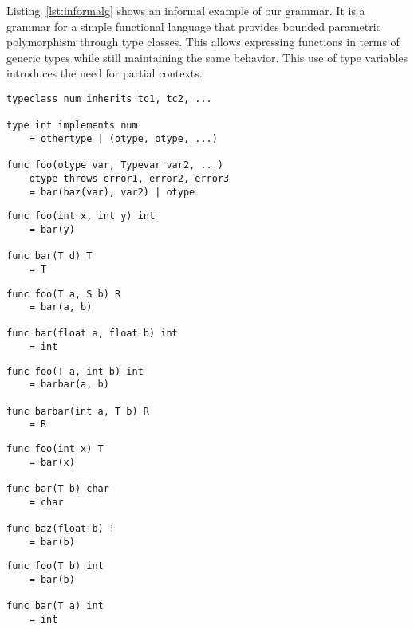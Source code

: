 \documentclass{acm_proc_article-sp}
\begin{document}
Listing~\ref{lst:informalg} shows an informal example of our grammar. It is a
grammar for a simple functional language that provides bounded parametric
polymorphism through type classes. This allows expressing functions in terms of
generic types while still maintaining the same behavior. This use of type
variables introduces the need for partial contexts.

\begin{lstlisting}[caption=Grammar displayed informally,language=Paratype,label=lst:informalg]
typeclass num inherits tc1, tc2, ...

type int implements num
    = othertype | (otype, otype, ...)

func foo(otype var, Typevar var2, ...)
    otype throws error1, error2, error3
    = bar(baz(var), var2) | otype
\end{lstlisting}

\begin{lstlisting}[caption=Explicit context provided by parents,language=Paratype,label=lst:cbyparent]
func foo(int x, int y) int
    = bar(y)

func bar(T d) T
    = T
\end{lstlisting}

\begin{lstlisting}[caption=Explicit context provided by child,language=Paratype,label=lst:cbychild]
func foo(T a, S b) R
    = bar(a, b)

func bar(float a, float b) int
    = int
\end{lstlisting}

\begin{lstlisting}[caption=Explicit context provided by child and parent,language=Paratype,label=lst:cbyboth]
func foo(T a, int b) int
    = barbar(a, b)

func barbar(int a, T b) R
    = R
\end{lstlisting}

\begin{lstlisting}[caption=Need to maintain partial contexts,language=Paratype,label=lst:partial]
func foo(int x) T
    = bar(x)

func bar(T b) char
    = char

func baz(float b) T
    = bar(b)
\end{lstlisting}

\begin{lstlisting}[caption=Unhalting context resolution,language=Paratype,label=lst:unhalting]
func foo(T b) int
    = bar(b)

func bar(T a) int
    = int
\end{lstlisting}
\end{document}
